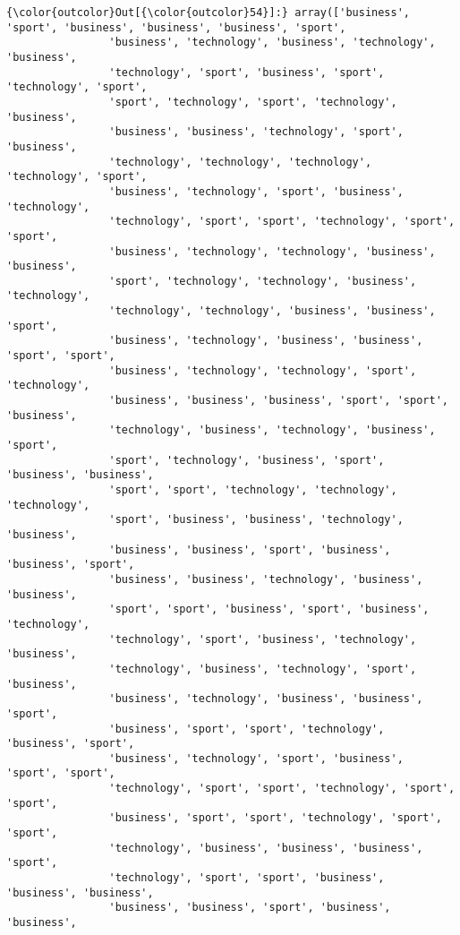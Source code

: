 \documentclass[11pt]{article}
\begin{document}
\begin{Verbatim}[commandchars=\\\{\}]
{\color{outcolor}Out[{\color{outcolor}54}]:} array(['business', 'sport', 'business', 'business', 'business', 'sport',
                'business', 'technology', 'business', 'technology', 'business',
                'technology', 'sport', 'business', 'sport', 'technology', 'sport',
                'sport', 'technology', 'sport', 'technology', 'business',
                'business', 'business', 'technology', 'sport', 'business',
                'technology', 'technology', 'technology', 'technology', 'sport',
                'business', 'technology', 'sport', 'business', 'technology',
                'technology', 'sport', 'sport', 'technology', 'sport', 'sport',
                'business', 'technology', 'technology', 'business', 'business',
                'sport', 'technology', 'technology', 'business', 'technology',
                'technology', 'technology', 'business', 'business', 'sport',
                'business', 'technology', 'business', 'business', 'sport', 'sport',
                'business', 'technology', 'technology', 'sport', 'technology',
                'business', 'business', 'business', 'sport', 'sport', 'business',
                'technology', 'business', 'technology', 'business', 'sport',
                'sport', 'technology', 'business', 'sport', 'business', 'business',
                'sport', 'sport', 'technology', 'technology', 'technology',
                'sport', 'business', 'business', 'technology', 'business',
                'business', 'business', 'sport', 'business', 'business', 'sport',
                'business', 'business', 'technology', 'business', 'business',
                'sport', 'sport', 'business', 'sport', 'business', 'technology',
                'technology', 'sport', 'business', 'technology', 'business',
                'technology', 'business', 'technology', 'sport', 'business',
                'business', 'technology', 'business', 'business', 'sport',
                'business', 'sport', 'sport', 'technology', 'business', 'sport',
                'business', 'technology', 'sport', 'business', 'sport', 'sport',
                'technology', 'sport', 'sport', 'technology', 'sport', 'sport',
                'business', 'sport', 'sport', 'technology', 'sport', 'sport',
                'technology', 'business', 'business', 'business', 'sport',
                'technology', 'sport', 'sport', 'business', 'business', 'business',
                'business', 'business', 'sport', 'business', 'business',

\end{Verbatim}
\end{document}
